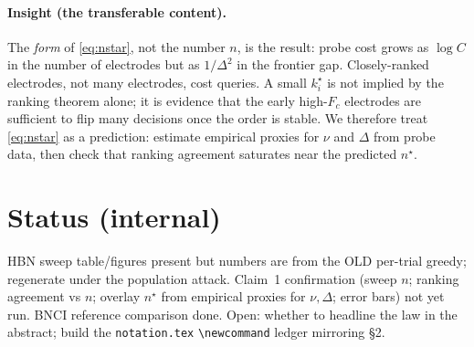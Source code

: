 \documentclass[11pt]{article}
\begin{document}
\paragraph{Insight (the transferable content).} The \emph{form} of \eqref{eq:nstar}, not
the number $n$, is the result: probe cost grows as $\log C$ in the number of electrodes
but as $1/\Delta^2$ in the frontier gap. Closely-ranked electrodes, not many electrodes,
cost queries. A small $k_i^\star$ is not implied by the ranking theorem alone; it is
evidence that the early high-$F_c$ electrodes are sufficient to flip many decisions once
the order is stable.
We therefore treat \eqref{eq:nstar} as a prediction: estimate empirical proxies for
$\nu$ and $\Delta$ from probe data, then check that ranking agreement saturates near the
predicted $n^\star$.

\section*{Status (internal)}
\small
HBN sweep table/figures present but numbers are from the OLD per-trial greedy; regenerate
under the population attack. Claim~1 confirmation (sweep $n$; ranking agreement vs $n$;
overlay $n^\star$ from empirical proxies for $\nu,\Delta$; error bars) not yet run. BNCI reference
comparison done. Open: whether to headline the law in the abstract; build the
\texttt{notation.tex} \verb|\newcommand| ledger mirroring \S2.
\end{document}
